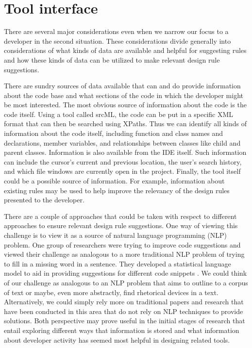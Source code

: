 \documentclass[12pt]{article}
\begin{document}
	

				
		
	
	










\section{Tool interface} \label{toolInterface}
There are several major considerations even when we narrow our focus to a developer in the second situation. These considerations divide generally into considerations of what kinds of data are available and helpful for suggesting rules and how these kinds of data can be utilized to make relevant design rule suggestions.

There are sundry sources of data available that can and do provide information about the code base and what sections of the code in which the developer might be most interested. The most obvious source of information about the code is the code itself. Using a tool called srcML, the code can be put in a specific XML format that can then be searched using XPaths. Thus we can identify all kinds of information about the code itself, including function and class names and declarations, member variables, and relationships between classes like child and parent classes. Information is also available from the IDE itself. Such information can include the cursor's current and previous location, the user's search history, and which file windows are currently open in the project. Finally, the tool itself could be a possible source of information. For example, information about existing rules may be used to help improve the relevancy of the design rules presented to the developer.

There are a couple of approaches that could be taken with respect to different approaches to ensure relevant design rule suggestions. One way of viewing this challenge is to view it as a source of natural language programming (NLP) problem. One group of researchers were trying to improve code suggestions and viewed their challenge as analogous to a more traditional NLP problem of trying to fill in a missing word in a sentence. They developed a statistical language model to aid in providing suggestions for different code snippets \cite{RaychevEtAl2014}. We could think of our challenge as analogous to an NLP problem that aims to outline to a corpus of text or maybe, even more abstractly, find rhetorical devices in a text. Alternatively, we could simply rely more on traditional papers and research that have been conducted in this area that do not rely on NLP techniques to provide solutions. Both perspective may prove useful in the initial stages of research that entail exploring different ways that information is stored and what information about developer activity has seemed most helpful in designing related tools. 
\end{document}
